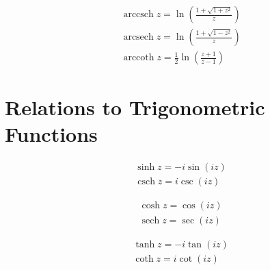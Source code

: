 \documentclass[12pt]{article}
\begin{document}
\begin{align*}
& \operatorname{arccsch}z=\ln\left(\frac{1+\sqrt{1+z^2}}{z}\right) \\
& \operatorname{arcsech}z=\ln\left(\frac{1+\sqrt{1-z^2}}{z}\right) \\
& \operatorname{arccoth}z=\frac{1}{2}\ln\left(\frac{z+1}{z-1}\right)
\end{align*}


\section{Relations to Trigonometric Functions}

\begin{align*}
& \sinh z=-i\sin\left(iz\right) \\
& \operatorname{csch}z=i\csc\left(iz\right)
\end{align*}

\begin{align*}
& \cosh z=\cos\left(iz\right) \\
& \operatorname{sech}z=\sec\left(iz\right)
\end{align*}

\begin{align*}
& \tanh z=-i\tan\left(iz\right) \\
& \coth z=i\cot\left(iz\right)
\end{align*}
\end{document}
